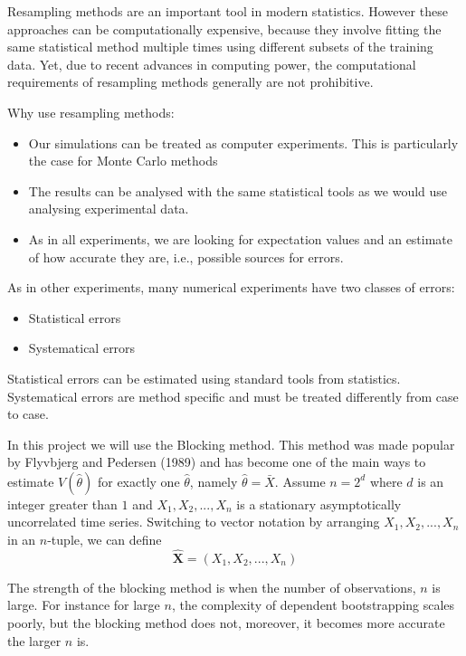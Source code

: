 \documentclass[a4paper, 10pt, english]{revtex4-2} %
\begin{document}
        Resampling methods are an important tool in modern statistics. 
        However these approaches can be computationally expensive, because they involve fitting the same statistical method multiple times using different subsets of the training data. 
        Yet, due to recent advances in computing power, the computational requirements of resampling methods generally are not prohibitive. 

        Why use resampling methods:
        \begin{itemize}
            \item Our simulations can be treated as computer experiments. This is particularly the case for Monte Carlo methods
            \item The results can be analysed with the same statistical tools as we would use analysing experimental data.
            \item As in all experiments, we are looking for expectation values and an estimate of how accurate they are, i.e., possible sources for errors.
        \end{itemize}

        As in other experiments, many numerical experiments have two classes of errors:
        \begin{itemize}
            \item Statistical errors
            \item Systematical errors
        \end{itemize}
        Statistical errors can be estimated using standard tools from statistics.
        Systematical errors are method specific and must be treated differently from case to case.

        In this project we will use the Blocking method.
        This method was made popular by Flyvbjerg and Pedersen (1989) and has become one of the main ways to estimate $V(\hat{\theta})$ for exactly one $\hat{\theta}$, namely $\hat{\theta} = \bar{X}$.
        Assume $n = 2^d$ where $d$ is an integer greater than $1$ and $X_1, X_2, ..., X_n$ is a stationary asymptotically uncorrelated time series.
        Switching to vector notation by arranging $X_1, X_2, ..., X_n$ in an $n$-tuple, we can define
        \begin{equation}
                \hat{\mathbf{X}}
            =   (X_1, X_2, ..., X_n)
        \end{equation}

        The strength of the blocking method is when the number of observations, $n$ is large. 
        For instance for large $n$, the complexity of dependent bootstrapping scales poorly, but the blocking method does not, moreover, it becomes more accurate the larger $n$ is.
\end{document}
